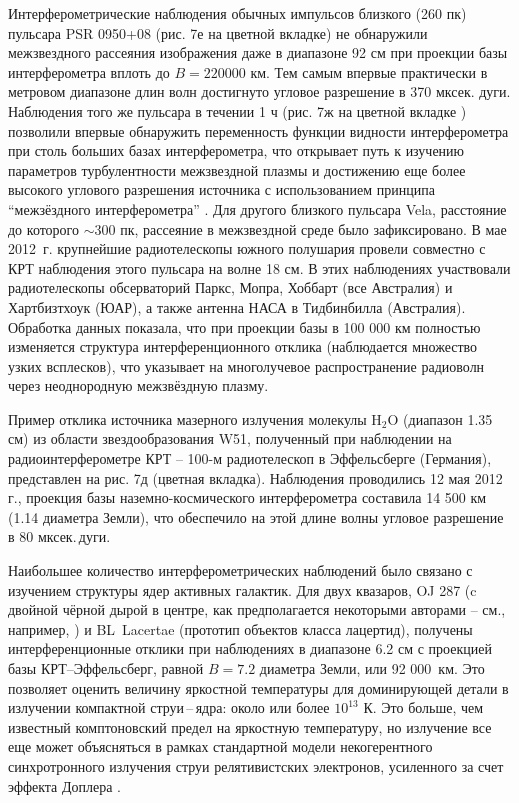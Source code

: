 Интерферометрические наблюдения обычных импульсов близкого (260 пк)
пульсара PSR 0950+08 (рис. 7е на цветной вкладке) не обнаружили межзвездного рассеяния
изображения даже в диапазоне 92 см при  проекции базы интерферометра
вплоть до $B=220 000$ км. Тем самым впервые практически в метровом
диапазоне длин волн достигнуто угловое разрешение в  370
мксек. дуги.
Наблюдения того же пульсара в течении 1 ч (рис. 7ж на цветной вкладке ) позволили впервые
обнаружить переменность функции видности интерферометра при столь
больших базах интерферометра, что открывает путь к изучению параметров
турбулентности межзвездной плазмы и достижению еще более высокого углового
разрешения источника с использованием принципа ``межзёздного интерферометра''
 \cite{}.
Для другого близкого пульсара Vela, расстояние до которого $\sim 300$ пк,
рассеяние в межзвездной среде было зафиксировано.
В мае 2012~г. крупнейшие радиотелескопы южного полушария провели совместно
с КРТ наблюдения этого пульсара на волне 18 см.
В этих наблюдениях участвовали радиотелескопы обсерваторий Паркс, Мопра,
Хоббарт (все Австралия) и Хартбизтхоук (ЮАР), а также антенна НАСА в
Тидбинбилла (Австралия). Обработка данных показала, что при проекции базы
в 100 000 км полностью изменяется структура интерференционного отклика
(наблюдается множество узких всплесков), что указывает на многолучевое
распространение радиоволн через неоднородную межзвёздную плазму.

Пример отклика источника мазерного излучения молекулы H$_2$O (диапазон 1.35 см)
из области звездообразования W51, полученный при наблюдении на
радиоинтерферометре КРТ -- 100-м  радиотелескоп в Эффельсберге
(Германия), представлен на рис. 7д (цветная вкладка). Наблюдения проводились 12 мая 2012 г.,
проекция базы наземно-космического интерферометра составила
14 500 км (1.14 диаметра Земли), что обеспечило на этой длине волны
угловое разрешение в 80 мксек.\,дуги.

Наибольшее количество интерферометрических наблюдений было связано с
изучением структуры ядер активных галактик. Для двух квазаров, OJ 287
(c двойной чёрной дырой в центре, как предполагается некоторыми авторами --
см., например, \cite{}) и BL~Lacertae
(прототип объектов класса лацертид), получены интерференционные отклики
при наблюдениях в диапазоне 6.2 см с проекцией базы КРТ--Эффельсберг,
равной $B = 7.2$ диаметра Земли, или 92 000~км.
Это позволяет оценить величину яркостной температуры
для доминирующей детали в излучении компактной струи\,--\,ядра:
около или более $10^{13}$ К.
Это больше, чем
известный комптоновский предел \cite{} на яркостную температуру,
но излучение все еще может объясняться в рамках стандартной модели
некогерентного синхротронного излучения струи релятивистских электронов,
усиленного за счет эффекта Доплера \cite{}.

